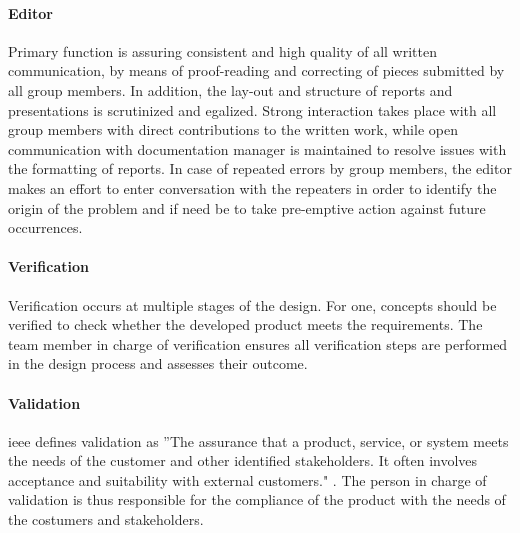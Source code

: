 \paragraph{Editor}
Primary function is assuring consistent and high quality of all written communication, by means of proof-reading and correcting of pieces submitted by all group members. In addition, the lay-out and structure of reports and presentations is scrutinized and egalized. Strong interaction takes place with all group members with direct contributions to the written work, while open communication with documentation manager is maintained to resolve issues with the formatting of reports. In case of repeated errors by group members, the editor makes an effort to enter conversation with the repeaters in order to identify the origin of the problem and if need be to take pre-emptive action against future occurrences.
\paragraph{Verification}
Verification occurs at multiple stages of the design. For one, concepts should be verified to check whether the developed product meets the requirements. The team member in charge of verification ensures all verification steps are performed in the design process and assesses their outcome.

\paragraph{Validation}
\gls{ieee} defines validation as ''The assurance that a product, service, or system meets the needs of the customer and other identified stakeholders. It often involves acceptance and suitability with external customers." \cite[p.452]{IEEE}. The person in charge of validation is thus responsible for the compliance of the product with the needs of the costumers and stakeholders.
